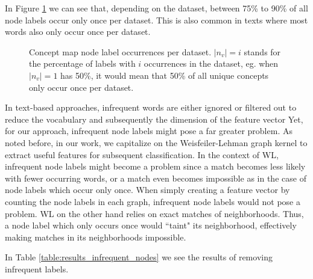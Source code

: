 
In Figure \ref{fig:percentage_distribution_concept_occurrences} we can see that, depending on the dataset, between 75\% to 90\% of all node labels occur only once per dataset.
This is also common in texts where most words also only occur once per dataset.
 
\begin{figure}[htb!]
	\caption[Statistics: Distribution concept occurrence]{Concept map node label occurrences per dataset. $|n_v| = i$ stands for the percentage of labels with $i$ occurrences in the dataset, eg. when $|n_v| = 1$ has 50\%, it would mean that 50\% of all unique concepts only occur once per dataset.}\label{fig:percentage_distribution_concept_occurrences}
\end{figure}

In text-based approaches, infrequent words are either ignored or filtered out to reduce the vocabulary and subsequently the dimension of the feature vector
Yet, for our approach, infrequent node labels might pose a far greater problem.
As noted before, in our work, we capitalize on the Weisfeiler-Lehman graph kernel to extract useful features for subsequent classification.
In the context of WL, infrequent node labels might become a problem since a match becomes less likely with fewer occurring words, or a match even becomes impossible as in the case of node labels which occur only once.
When simply creating a feature vector by counting the node labels in each graph, infrequent node labels would not pose a problem.
WL on the other hand relies on exact matches of neighborhoods.
Thus, a node label which only occurs once would ``taint" its neighborhood, effectively making matches in its neighborhoods impossible.

In Table \ref{table:results_infrequent_nodes} we see the results of removing infrequent labels.

